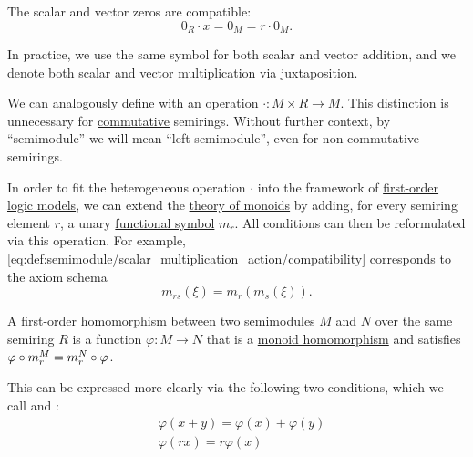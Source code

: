 \begin{definition}
\begin{thmenum}
     The scalar and vector zeros are compatible:
    \begin{equation}\label{eq:def:semimodule/absorption}
      0_R \cdot x = 0_M = r \cdot 0_M.
    \end{equation}
  \end{thmenum}

  In practice, we use the same symbol for both scalar and vector addition, and we denote both scalar and vector multiplication via juxtaposition.

  We can analogously define  with an operation \( \cdot: M \times R \to M \). This distinction is unnecessary for \hyperref[def:magma/commutative]{commutative} semirings. Without further context, by \enquote{semimodule} we will mean \enquote{left semimodule}, even for non-commutative semirings.

  \begin{thmenum}
     In order to fit the heterogeneous operation \( \cdot \) into the framework of \hyperref[def:first_order_semantics/satisfiability]{first-order logic models}, we can extend the \hyperref[def:monoid/theory]{theory of monoids} by adding, for every semiring element \( r \), a unary \hyperref[def:first_order_language/func]{functional symbol} \( m_r \). All conditions can then be reformulated via this operation. For example, \eqref{eq:def:semimodule/scalar_multiplication_action/compatibility} corresponds to the axiom schema
    \begin{equation*}
      m_{rs}(\xi) = m_r(m_s(\xi)).
    \end{equation*}

     A \hyperref[def:first_order_homomorphism]{first-order homomorphism} between two semimodules \( M \) and \( N \) over the same semiring \( R \) is a function \( \varphi: M \to N \) that is a \hyperref[def:monoid/homomorphism]{monoid homomorphism} and satisfies \( \varphi \bincirc m_r^M = m_r^N \bincirc \varphi \).

    This can be expressed more clearly via the following two conditions, which we call  and :
    \begin{align}
      &\varphi(x + y) = \varphi(x) + \varphi(y) \label{def:semimodule/homomorphism/additive} \\
      &\varphi(rx) = r \varphi(x) \label{def:semimodule/homomorphism/homogeneity}
    \end{align}


\end{thmenum}
\end{definition}
